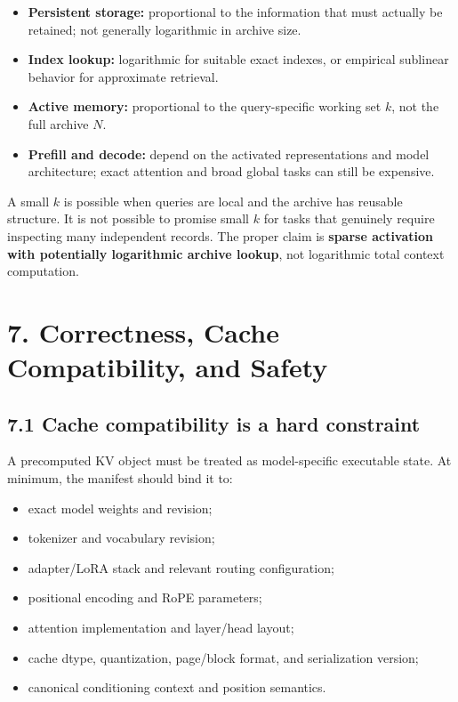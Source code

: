 \documentclass[
  10pt,
]{article}
\providecommand{\tightlist}{%
  \setlength{\itemsep}{0pt}\setlength{\parskip}{0pt}}
\begin{document}
\begin{itemize}
\tightlist
\item
  \textbf{Persistent storage:} proportional to the information that must
  actually be retained; not generally logarithmic in archive size.
\item
  \textbf{Index lookup:} logarithmic for suitable exact indexes, or
  empirical sublinear behavior for approximate retrieval.
\item
  \textbf{Active memory:} proportional to the query-specific working set
  \(k\), not the full archive \(N\).
\item
  \textbf{Prefill and decode:} depend on the activated representations
  and model architecture; exact attention and broad global tasks can
  still be expensive.
\end{itemize}

A small \(k\) is possible when queries are local and the archive has
reusable structure. It is not possible to promise small \(k\) for tasks
that genuinely require inspecting many independent records. The proper
claim is \textbf{sparse activation with potentially logarithmic archive
lookup}, not logarithmic total context computation.

\section{7. Correctness, Cache Compatibility, and
Safety}\label{correctness-cache-compatibility-and-safety}

\subsection{7.1 Cache compatibility is a hard
constraint}\label{cache-compatibility-is-a-hard-constraint}

A precomputed KV object must be treated as model-specific executable
state. At minimum, the manifest should bind it to:

\begin{itemize}
\tightlist
\item
  exact model weights and revision;
\item
  tokenizer and vocabulary revision;
\item
  adapter/LoRA stack and relevant routing configuration;
\item
  positional encoding and RoPE parameters;
\item
  attention implementation and layer/head layout;
\item
  cache dtype, quantization, page/block format, and serialization
  version;
\item
  canonical conditioning context and position semantics.
\end{itemize}
\end{document}
